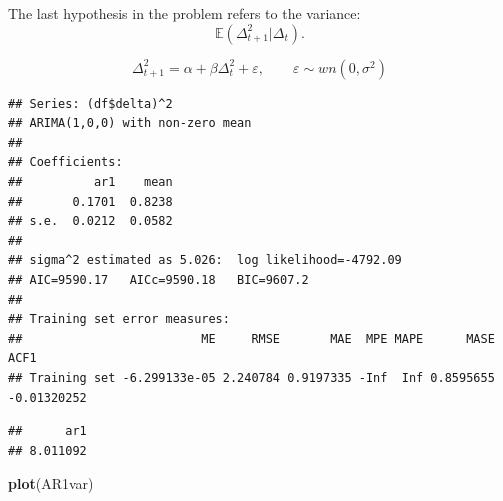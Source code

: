 \documentclass[11pt, a4paper]{report}
\newenvironment{Shaded}{\begin{snugshade}}{\end{snugshade}}
\newcommand{\DataTypeTok}[1]{\textcolor[rgb]{0.13,0.29,0.53}{#1}}
\newcommand{\DecValTok}[1]{\textcolor[rgb]{0.00,0.00,0.81}{#1}}
\newcommand{\KeywordTok}[1]{\textcolor[rgb]{0.13,0.29,0.53}{\textbf{#1}}}
\newcommand{\NormalTok}[1]{#1}
\newcommand{\OperatorTok}[1]{\textcolor[rgb]{0.81,0.36,0.00}{\textbf{#1}}}
\newcommand{\StringTok}[1]{\textcolor[rgb]{0.31,0.60,0.02}{#1}}
\theoremstyle{plain}
\theoremstyle{plain}
\theoremstyle{remark}
\begin{document}
The last hypothesis in the problem refers to the variance:
\[\mathbb{E}(\Delta_{t+1}^2 | \Delta_t).\]

\[\Delta^2_{t+1} = \alpha + \beta \Delta^2_t + \varepsilon, \hspace{2em} \varepsilon \sim wn(0, \sigma^2)\]

\begin{Shaded}
\end{Shaded}

\begin{verbatim}
## Series: (df$delta)^2 
## ARIMA(1,0,0) with non-zero mean 
## 
## Coefficients:
##          ar1    mean
##       0.1701  0.8238
## s.e.  0.0212  0.0582
## 
## sigma^2 estimated as 5.026:  log likelihood=-4792.09
## AIC=9590.17   AICc=9590.18   BIC=9607.2
## 
## Training set error measures:
##                         ME     RMSE       MAE  MPE MAPE      MASE        ACF1
## Training set -6.299133e-05 2.240784 0.9197335 -Inf  Inf 0.8595655 -0.01320252
\end{verbatim}

\begin{Shaded}
\end{Shaded}

\begin{verbatim}
##      ar1 
## 8.011092
\end{verbatim}

\begin{Shaded}
\begin{Highlighting}[]
\KeywordTok{plot}\NormalTok{(AR1var)}
\end{Highlighting}
\end{Shaded}
\end{document}
